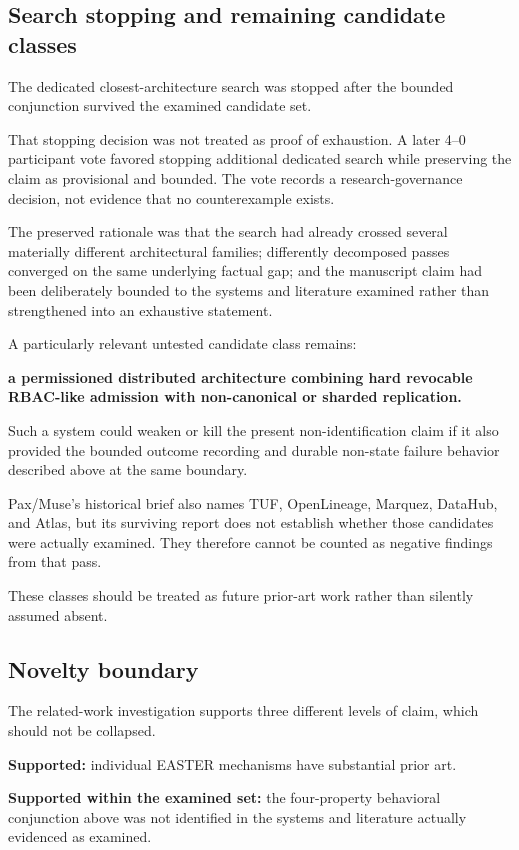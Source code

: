 \documentclass[11pt]{article}
\begin{document}
\subsection{Search stopping and remaining candidate classes}

The dedicated closest-architecture search was stopped after the bounded conjunction survived the examined candidate set.

That stopping decision was not treated as proof of exhaustion. A later 4--0 participant vote favored stopping additional dedicated search while preserving the claim as provisional and bounded. The vote records a research-governance decision, not evidence that no counterexample exists.

The preserved rationale was that the search had already crossed several materially different architectural families; differently decomposed passes converged on the same underlying factual gap; and the manuscript claim had been deliberately bounded to the systems and literature examined rather than strengthened into an exhaustive statement.

A particularly relevant untested candidate class remains:

\textbf{a permissioned distributed architecture combining hard revocable RBAC-like admission with non-canonical or sharded replication.}

Such a system could weaken or kill the present non-identification claim if it also provided the bounded outcome recording and durable non-state failure behavior described above at the same boundary.

Pax/Muse's historical brief also names TUF, OpenLineage, Marquez, DataHub, and Atlas, but its surviving report does not establish whether those candidates were actually examined. They therefore cannot be counted as negative findings from that pass.

These classes should be treated as future prior-art work rather than silently assumed absent.

\subsection{Novelty boundary}

The related-work investigation supports three different levels of claim, which should not be collapsed.

\textbf{Supported:} individual EASTER mechanisms have substantial prior art.

\textbf{Supported within the examined set:} the four-property behavioral conjunction above was not identified in the systems and literature actually evidenced as examined.
\end{document}
